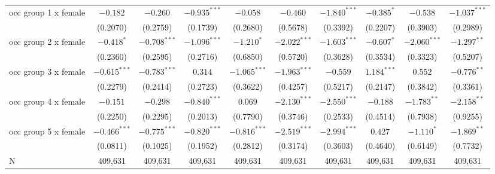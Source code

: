 \begin{tabular}{l|ccc|ccc|ccc|}
occ group 1 x female &        $-0.182$ &        $-0.260$ &  $-0.935^{***}$ &        $-0.058$ &        $-0.460$ &  $-1.840^{***}$ &      $-0.385^*$ &        $-0.538$ &  $-1.037^{***}$ \\
                     &        (0.2070) &        (0.2759) &        (0.1739) &        (0.2680) &        (0.5678) &        (0.3392) &        (0.2207) &        (0.3903) &        (0.2989) \\
occ group 2 x female &      $-0.418^*$ &  $-0.708^{***}$ &  $-1.096^{***}$ &      $-1.210^*$ &  $-2.022^{***}$ &  $-1.603^{***}$ &      $-0.607^*$ &  $-2.060^{***}$ &   $-1.297^{**}$ \\
                     &        (0.2360) &        (0.2595) &        (0.2716) &        (0.6850) &        (0.5720) &        (0.3628) &        (0.3534) &        (0.3323) &        (0.5207) \\
occ group 3 x female &  $-0.615^{***}$ &  $-0.783^{***}$ &         $0.314$ &  $-1.065^{***}$ &  $-1.963^{***}$ &        $-0.559$ &   $1.184^{***}$ &         $0.552$ &   $-0.776^{**}$ \\
                     &        (0.2279) &        (0.2414) &        (0.2723) &        (0.3622) &        (0.4257) &        (0.5217) &        (0.2147) &        (0.3842) &        (0.3361) \\
occ group 4 x female &        $-0.151$ &        $-0.298$ &  $-0.840^{***}$ &         $0.069$ &  $-2.130^{***}$ &  $-2.550^{***}$ &        $-0.188$ &   $-1.783^{**}$ &   $-2.158^{**}$ \\
                     &        (0.2250) &        (0.2295) &        (0.2013) &        (0.7790) &        (0.3746) &        (0.2533) &        (0.4514) &        (0.7938) &        (0.9255) \\
occ group 5 x female &  $-0.466^{***}$ &  $-0.775^{***}$ &  $-0.820^{***}$ &  $-0.816^{***}$ &  $-2.519^{***}$ &  $-2.994^{***}$ &         $0.427$ &      $-1.110^*$ &   $-1.869^{**}$ \\
                     &        (0.0811) &        (0.1025) &        (0.1952) &        (0.2812) &        (0.3174) &        (0.3603) &        (0.4640) &        (0.6149) &        (0.7732) \\
N                    &         409,631 &         409,631 &         409,631 &         409,631 &         409,631 &         409,631 &         409,631 &         409,631 &         409,631 \\
\bottomrule
\end{tabular}
